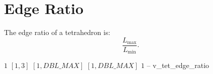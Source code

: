 \section{Edge Ratio}

The edge ratio of a tetrahedron is: 
\[
\frac{L_{\max}}{L_{\min}}.
\]

%
{$1$}%
{$[1,3]$}%
{$[1,DBL\_MAX]$}%
{$[1,DBL\_MAX]$}%
{$1$}%
{--}%
{v\_tet\_edge\_ratio}%

